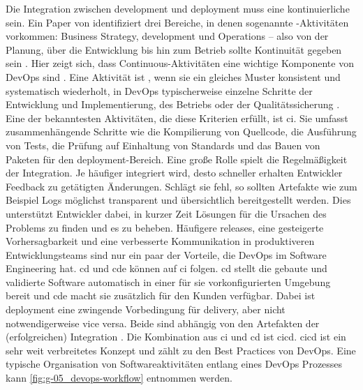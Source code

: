 Die Integration zwischen \Gls{development} und \Gls{deployment} muss eine kontinuierliche sein. Ein Paper von \citeauthor{005:Continous-Software-Engineering-and-Beyond} identifiziert drei Bereiche, in denen sogenannte -Aktivitäten vorkommen: Business Strategy, \Gls{development} und Operations -- also von der Planung, über die Entwicklung bis hin zum Betrieb sollte Kontinuität gegeben sein \cite{005:Continous-Software-Engineering-and-Beyond}. Hier zeigt sich, dass Continuous-Aktivitäten eine wichtige Komponente von DevOps sind \cite{000:CI-CD-Deployment-in-DevOps-reduce-Gap-Developer-Operation}. Eine Aktivität ist , wenn sie ein gleiches Muster konsistent und systematisch wiederholt, in DevOps typischerweise einzelne Schritte der Entwicklung und Implementierung, des Betriebs oder der Qualitätssicherung \cite{007:Analysis-of-Declarative-and-Pull-based-Deployment-Models-on-GitOps}. Eine der bekanntesten Aktivitäten, die diese Kriterien erfüllt, ist \acrfull{ci}. Sie umfasst zusammenhängende Schritte wie die Kompilierung von Quellcode, die Ausführung von Tests, die Prüfung auf Einhaltung von Standards und das Bauen von Paketen für den \Gls{deployment}-Bereich. Eine große Rolle spielt die Regelmäßigkeit der Integration. Je häufiger integriert wird, desto schneller erhalten Entwickler Feedback zu getätigten Änderungen. Schlägt sie fehl, so sollten Artefakte wie zum Beispiel Logs möglichst transparent und übersichtlich bereitgestellt werden. Dies unterstützt Entwickler dabei, in kurzer Zeit Lösungen für die Ursachen des Problems zu finden und es zu beheben. Häufigere \Glspl{release}, eine gesteigerte Vorhersagbarkeit und eine verbesserte Kommunikation in produktiveren Entwicklungsteams sind nur ein paar der Vorteile, die DevOps im Software Engineering hat. \acrfull{cd} und \acrfull{cde} können auf \Gls{ci} folgen. \acrshort{cd} stellt die gebaute und validierte Software automatisch in einer für sie vorkonfigurierten Umgebung bereit und \acrshort{cde} macht sie zusätzlich für den Kunden verfügbar. Dabei ist \Gls{deployment} eine zwingende Vorbedingung für \Gls{delivery}, aber nicht notwendigerweise vice versa. Beide sind abhängig von den Artefakten der (erfolgreichen) Integration \cite{005:Continous-Software-Engineering-and-Beyond}. Die Kombination aus \Gls{ci} und \Gls{cd} ist \acrfull{cicd}. \Gls{cicd} ist ein sehr weit verbreitetes Konzept und zählt zu den Best Practices von DevOps. Eine typische Organisation von Softwareaktivitäten entlang eines DevOps Prozesses kann \autoref{fig:g-05_devops-workflow} entnommen werden.

